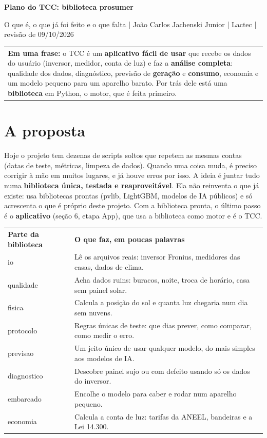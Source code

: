 \documentclass[10pt,a4paper]{article}
\newcommand{\cab}[1]{\cellcolor{acento}\color{white}\bfseries #1}
\newcommand{\caixa}[1]{%
  \noindent\begin{tabular}{!{\color{acento}\vrule width 3pt}>{\columncolor{claro}}p{\dimexpr\linewidth-3pt-2\tabcolsep}}
  \rule{0pt}{14pt}#1\vspace{6pt}\\
  \end{tabular}\par\vspace{4pt}}
\begin{document}
\small

{\color{acento}\bfseries\LARGE Plano do TCC: biblioteca prosumer\par}
\vspace{2pt}
{\color{cinza}O que é, o que já foi feito e o que falta \;|\; João Carlos Jachenski Junior \;|\; Lactec \;|\; revisão de 09/10/2026\par}
\vspace{8pt}

\caixa{\textbf{Em uma frase:} o TCC é um \textbf{aplicativo fácil de usar} que recebe os dados do
usuário (inversor, medidor, conta de luz) e faz a \textbf{análise completa}: qualidade dos dados,
diagnóstico, previsão de \textbf{geração} e \textbf{consumo}, economia e um modelo pequeno para um
aparelho barato. Por trás dele está uma \textbf{biblioteca} em Python, o motor, que é feita primeiro.}

\section{A proposta}
Hoje o projeto tem dezenas de scripts soltos que repetem as mesmas contas (datas de teste, métricas,
limpeza de dados). Quando uma coisa muda, é preciso corrigir à mão em muitos lugares, e já houve erros
por isso. A ideia é juntar tudo numa \textbf{biblioteca única, testada e reaproveitável}. Ela não
reinventa o que já existe: usa bibliotecas prontas (pvlib, LightGBM, modelos de IA públicos) e só
acrescenta o que é próprio deste projeto. Com a biblioteca pronta, o último passo é o
\textbf{aplicativo} (seção 6, etapa App), que usa a biblioteca como motor e é o TCC.

\begin{tabularx}{\linewidth}{@{}>{\raggedright\arraybackslash}p{3.2cm}Y@{}}
\cab{Parte da biblioteca} & \cab{O que faz, em poucas palavras} \\
io          & Lê os arquivos reais: inversor Fronius, medidores das casas, dados de clima. \\
qualidade   & Acha dados ruins: buracos, noite, troca de horário, casa sem painel solar. \\
fisica      & Calcula a posição do sol e quanta luz chegaria num dia sem nuvens. \\
protocolo   & Regras únicas de teste: que dias prever, como comparar, como medir o erro. \\
previsao    & Um jeito único de usar qualquer modelo, do mais simples aos modelos de IA. \\
diagnostico & Descobre painel sujo ou com defeito usando só os dados do inversor. \\
embarcado   & Encolhe o modelo para caber e rodar num aparelho pequeno. \\
economia    & Calcula a conta de luz: tarifas da ANEEL, bandeiras e a Lei 14.300. \\
\end{tabularx}
\end{document}
